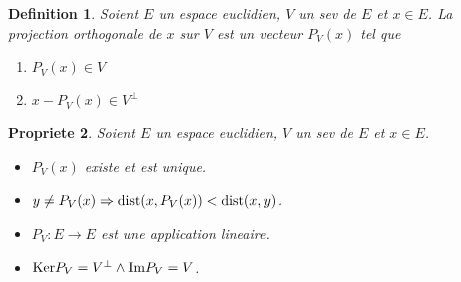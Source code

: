 \documentclass[11pt,a4paper]{article} %
\newtheorem{defin}{Definition}[section]
\newtheorem{prop}[defin]{Propriete}
\begin{document}
\begin{defin}
	Soient $E$ un espace euclidien, $V$ un sev de $E$ et $x \in E$.
	La projection orthogonale de $x$ sur $V$ est un vecteur $P_V(x)$ tel que
	\begin{enumerate}
		\item $P_V(x) \in V$
		\item $x - P_V(x) \in V^{\perp}$
	\end{enumerate}
\end{defin}

\begin{prop}
	Soient $E$ un espace euclidien, $V$ un sev de $E$ et $x \in E$.
	\begin{itemize}
		\item $P_V(x)$ existe et est unique.
		\item $y \neq P_V(x) \Rightarrow \mathrm{dist}(x, P_V(x)) < \mathrm{dist}(x, y)$.
		\item $P_V : E \to E$ est une application lineaire.
		\item $\mathrm{Ker} P_V = V^{\perp} \land \mathrm{Im} P_V = V$.
	\end{itemize}
\end{prop}
\end{document}
